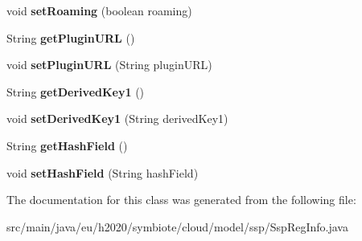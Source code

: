 \begin{DoxyCompactItemize}
void {\bfseries set\+Roaming} (boolean roaming)
\item 
\mbox{\label{classeu_1_1h2020_1_1symbiote_1_1cloud_1_1model_1_1ssp_1_1SspRegInfo_a93a2edf818e5aa4557fbfa15e9e4e95e}} 
String {\bfseries get\+Plugin\+U\+RL} ()
\item 
\mbox{\label{classeu_1_1h2020_1_1symbiote_1_1cloud_1_1model_1_1ssp_1_1SspRegInfo_ad0e820200d266573d735fe8dab8d79f3}} 
void {\bfseries set\+Plugin\+U\+RL} (String plugin\+U\+RL)
\item 
\mbox{\label{classeu_1_1h2020_1_1symbiote_1_1cloud_1_1model_1_1ssp_1_1SspRegInfo_a4bbdfa526dcda5117c0558daa3a4c73a}} 
String {\bfseries get\+Derived\+Key1} ()
\item 
\mbox{\label{classeu_1_1h2020_1_1symbiote_1_1cloud_1_1model_1_1ssp_1_1SspRegInfo_ad02767bcefb794c1a9e313ca4ea8e600}} 
void {\bfseries set\+Derived\+Key1} (String derived\+Key1)
\item 
\mbox{\label{classeu_1_1h2020_1_1symbiote_1_1cloud_1_1model_1_1ssp_1_1SspRegInfo_ae6427803ca88bcfc7035a2c6a06eb988}} 
String {\bfseries get\+Hash\+Field} ()
\item 
\mbox{\label{classeu_1_1h2020_1_1symbiote_1_1cloud_1_1model_1_1ssp_1_1SspRegInfo_a7983ae87da29a633ff688d0ac4d02f18}} 
void {\bfseries set\+Hash\+Field} (String hash\+Field)
\end{DoxyCompactItemize}


The documentation for this class was generated from the following file\+:\begin{DoxyCompactItemize}
\item 
src/main/java/eu/h2020/symbiote/cloud/model/ssp/Ssp\+Reg\+Info.\+java\end{DoxyCompactItemize}
